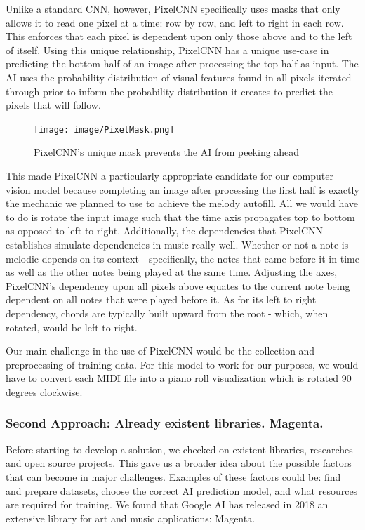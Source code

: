 Unlike a standard CNN, however, PixelCNN specifically uses masks that only allows it to read
one pixel at a time: row by row, and left to right in each row.\autocite{pixelCNN} This enforces that each pixel
is dependent upon only those above and to the left of itself. Using this unique relationship,
PixelCNN has a unique use-case in predicting the bottom half of an image after processing the
top half as input. The AI uses the probability distribution of visual features found in all pixels
iterated through prior to inform the probability distribution it creates to predict the pixels that
will follow.\autocite{pixelRNN}

\begin{figure}[h!]
  \centering
  \texttt{[image: image/PixelMask.png]}
  \caption{PixelCNN's unique mask prevents the AI from peeking ahead}
  \label{fig:pixel_mask}
\end{figure}

This made PixelCNN a particularly appropriate candidate for our computer vision model
because completing an image after processing the first half is exactly the mechanic we
planned to use to achieve the melody autofill. All we would have to do is rotate the input
image such that the time axis propagates top to bottom as opposed to left to right.
Additionally, the dependencies that PixelCNN establishes simulate dependencies in music
really well. Whether or not a note is melodic depends on its context - specifically, the
notes that came before it in time as well as the other notes being played at the same
time. Adjusting the axes, PixelCNN's dependency upon all pixels above equates to the
current note being dependent on all notes that were played before it. As for its left to
right dependency, chords are typically built upward from the root - which, when rotated,
would be left to right.

Our main challenge in the use of PixelCNN would be the collection and preprocessing of
training data. For this model to work for our purposes, we would have to convert each MIDI
file into a piano roll visualization which is rotated 90 degrees clockwise.

\subsubsection{Second Approach: Already existent libraries. Magenta.}

Before starting to develop a solution, we checked on existent libraries, researches and
open source projects. This gave us a broader idea about the possible factors that can
become in major challenges. Examples of these factors could be: find and prepare datasets,
choose the correct AI prediction model, and what resources are required for training. We
found that Google AI has released in 2018 an extensive library for art and music
applications: Magenta.

